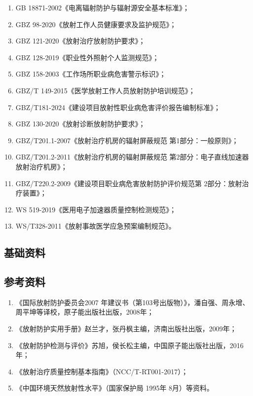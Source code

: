 \begin{enumerate}
\item GB 18871-2002《电离辐射防护与辐射源安全基本标准》；
\item GBZ 98-2020《放射工作人员健康要求及监护规范》；
\item GBZ 121-2020《放射治疗放射防护要求》；
\item GBZ 128-2019《职业性外照射个人监测规范》；
\item GBZ 158-2003《工作场所职业病危害警示标识》；
\item GBZ/T 149-2015《医学放射工作人员放射防护培训规范》；
\item GBZ/T181-2024《建设项目放射性职业病危害评价报告编制标准》；
\item GBZ 130-2020《放射诊断放射防护要求》；
\item GBZ/T201.1-2007《放射治疗机房的辐射屏蔽规范 第1部分：一般原则》；
\item GBZ/T201.2-2011《放射治疗机房的辐射屏蔽规范 第2部分：电子直线加速器放射治疗机房》；
\item GBZ/T220.2-2009《建设项目职业病危害放射防护评价规范第 2部分：放射治疗装置》；
\item WS 519-2019《医用电子加速器质量控制检测规范》；
\item WS/T328-2011《放射事故医学应急预案编制规范》。
\end{enumerate}

\subsection{基础资料}



\subsection{参考资料}
\begin{enumerate}
\item 《国际放射防护委员会2007 年建议书（第103号出版物）》，潘自强、周永增、周平坤等译校，原子能出版社出版，2008年；
\item 《放射防护实用手册》赵兰才，张丹枫主编，济南出版社出版，2009年；
\item 《放射防护检测与评价》苏旭，侯长松主编，中国原子能出版社出版，2016年；
\item 《放射治疗质量控制基本指南》（NCC/T-RT001-2017）；
\item 《中国环境天然放射性水平》（国家保护局 1995年 8月）等资料。
\end{enumerate}

